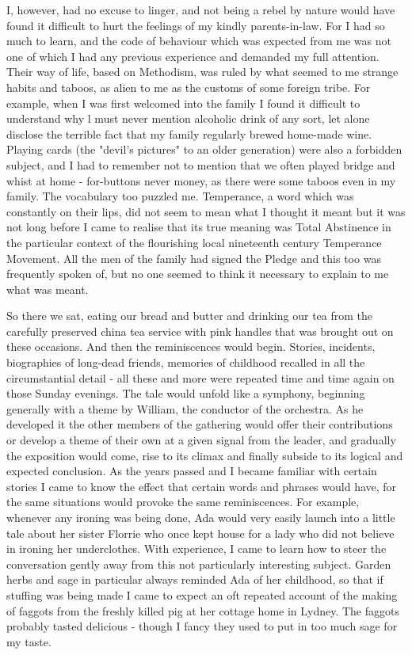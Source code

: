 I, however, had no excuse to linger, and not being a rebel by nature would have found it difficult to hurt the feelings of my kindly parents-in-law. For I had so much to learn, and the code of behaviour which was expected from me was not one of which I had any previous experience and demanded my full attention. Their way of life, based on Methodism, was ruled by what seemed to me strange habits and taboos, as alien to me as the customs of some foreign tribe. For example, when I was first welcomed into the family I found it difficult to understand why l must never mention alcoholic drink of any sort, let alone disclose the terrible fact that my family regularly brewed home-made wine. Playing cards (the "devil's pictures" to an older generation) were also a forbidden subject, and I had to remember not to mention that we often played bridge and whist at home - for-buttons never money, as there were some taboos even in my family. The vocabulary too puzzled me. Temperance, a word which was constantly on their lips, did not seem to mean what I thought it meant but it was not long before I came to realise that its true meaning was Total  Abstinence in the particular context of the flourishing local nineteenth century Temperance Movement. All the men of the family had signed the Pledge and this too was frequently spoken of, but no one seemed to think it necessary to explain to me what was meant.

So there we sat, eating our bread and butter and drinking our tea from the carefully preserved china tea service with pink handles that was brought out on these occasions. And then the reminiscences would begin. Stories, incidents, biographies of long-dead friends, memories of childhood recalled in all the circumstantial detail - all these and more were repeated time and time again on those Sunday evenings. The tale would unfold like a symphony, beginning generally with a theme by William, the conductor of the orchestra. As he developed it the other members of the gathering would offer their contributions or develop a theme of their own at a given signal from the leader, and gradually the exposition would come, rise to its climax and finally subside to its logical and expected conclusion. As the years passed and I became familiar with certain stories I came to know the effect that certain words and phrases would have, for the same situations would provoke the same reminiscences. For example, whenever any ironing was being done, Ada would very easily launch into a little tale about her sister Florrie who once kept house for a lady who did not believe in ironing her underclothes. With experience, I came to learn how to steer the conversation gently away from this not particularly interesting subject. Garden herbs and sage in particular always reminded Ada of her childhood, so that if stuffing was being made I came to expect an oft repeated account of the making of faggots from the freshly killed pig at her cottage home in Lydney. The faggots probably tasted delicious - though I fancy they used to put in too much sage for my taste.

